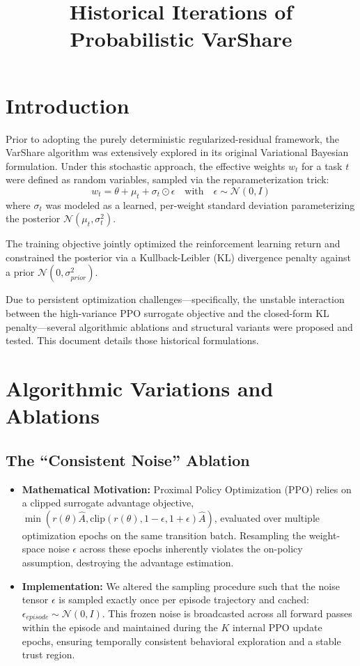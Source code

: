\documentclass[11pt,a4paper]{article}
\title{Historical Iterations of Probabilistic VarShare}
\author{}
\date{}
\begin{document}
\maketitle

\section{Introduction}
Prior to adopting the purely deterministic regularized-residual framework, the VarShare algorithm was extensively explored in its original Variational Bayesian formulation. Under this stochastic approach, the effective weights $w_t$ for a task $t$ were defined as random variables, sampled via the reparameterization trick:
\[ w_t = \theta + \mu_t + \sigma_t \odot \epsilon \quad \text{with} \quad \epsilon \sim \mathcal{N}(0, I) \]
where $\sigma_t$ was modeled as a learned, per-weight standard deviation parameterizing the posterior $\mathcal{N}(\mu_t, \sigma_t^2)$. 

The training objective jointly optimized the reinforcement learning return and constrained the posterior via a Kullback-Leibler (KL) divergence penalty against a prior $\mathcal{N}(0, \sigma_{prior}^2)$.

Due to persistent optimization challenges—specifically, the unstable interaction between the high-variance PPO surrogate objective and the closed-form KL penalty—several algorithmic ablations and structural variants were proposed and tested. This document details those historical formulations.

\section{Algorithmic Variations and Ablations}

\subsection{The ``Consistent Noise'' Ablation}
\begin{itemize}
    \item \textbf{Mathematical Motivation:} Proximal Policy Optimization (PPO) relies on a clipped surrogate advantage objective, $\min(r(\theta)\hat{A}, \text{clip}(r(\theta), 1-\epsilon, 1+\epsilon)\hat{A})$, evaluated over multiple optimization epochs on the same transition batch. Resampling the weight-space noise $\epsilon$ across these epochs inherently violates the on-policy assumption, destroying the advantage estimation.
    \item \textbf{Implementation:} We altered the sampling procedure such that the noise tensor $\epsilon$ is sampled exactly once per episode trajectory and cached: $\epsilon_{episode} \sim \mathcal{N}(0, I)$. This frozen noise is broadcasted across all forward passes within the episode and maintained during the $K$ internal PPO update epochs, ensuring temporally consistent behavioral exploration and a stable trust region.
\end{itemize}
\end{document}
